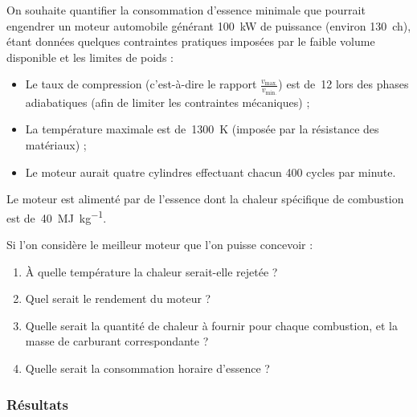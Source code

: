 	On souhaite quantifier la consommation d’essence minimale que pourrait engendrer un moteur automobile générant \SI{100}{\kilo\watt} de puissance (environ \SI{130}{ch}), étant données quelques contraintes pratiques imposées par le faible volume disponible et les limites de poids :
		
	\begin{itemize}
		\item Le taux de compression (c’est-à-dire le rapport $\frac{v_\text{max.}}{v_\text{min.}}$) est de~\num{12} lors des phases adiabatiques (afin de limiter les contraintes mécaniques) ;
		\item La température maximale est de~\SI{1300}{\kelvin} (imposée par la résistance des matériaux) ;
		\item Le moteur aurait quatre cylindres effectuant chacun \num{400} cycles par minute.
	\end{itemize}
	
	Le moteur est alimenté par de l’essence dont la chaleur spécifique de combustion est de~\SI{40}{\mega\joule\per\kilogram}.
	
	Si l’on considère le meilleur moteur que l’on puisse concevoir :
	
	\begin{enumerate}
		\item À quelle température la chaleur serait-elle rejetée ?
		\item Quel serait le rendement du moteur ?
		\item Quelle serait la quantité de chaleur à fournir pour chaque combustion, et la masse de carburant correspondante ?
		\item Quelle serait la consommation horaire d’essence ?
	\end{enumerate}

\exercisesolutionpage
\subsubsection*{Résultats}
	\linktosolutionsblurb


